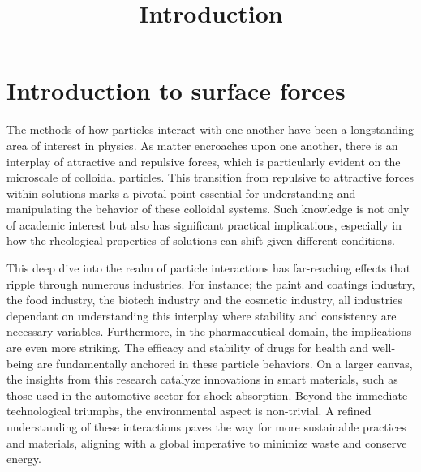 

\chapter{Introduction to surface forces}





 
\title{Introduction}

The methods of how particles interact with one another have been a longstanding area of interest in physics. As matter encroaches upon one another, there is an interplay of attractive and repulsive forces, which is particularly evident on the microscale of colloidal particles. This transition from repulsive to attractive forces within solutions marks a pivotal point essential for understanding and manipulating the behavior of these colloidal systems. Such knowledge is not only of academic interest but also has significant practical implications, especially in how the rheological properties of solutions can shift given different conditions.

This deep dive into the realm of particle interactions has far-reaching effects that ripple through numerous industries. For instance; the paint and coatings industry, the food industry, the biotech industry and the cosmetic industry, all industries dependant on understanding this interplay where stability and consistency are necessary variables. Furthermore, in the pharmaceutical domain, the implications are even more striking. The efficacy and stability of drugs for health and well-being are fundamentally anchored in these particle behaviors. On a larger canvas, the insights from this research catalyze innovations in smart materials, such as those used in the automotive sector for shock absorption. Beyond the immediate technological triumphs, the environmental aspect is non-trivial. A refined understanding of these interactions paves the way for more sustainable practices and materials, aligning with a global imperative to minimize waste and conserve energy. 

